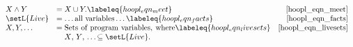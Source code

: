 \begin{math}
  \begin{array}{llr}
    X \wedge Y &= X \cup Y.\labeleq{hoopl_eqn_meet} & \eqref{hoopl_eqn_meet} \\
    \setL{Live} &= \dots \text{all variables} \dots \labeleq{hoopl_eqn_facts} & \eqref{hoopl_eqn_facts} \\
    X, Y, \dots &= \begin{minipage}[t]{2in}
      Sets of program variables, where $X$, $Y$, \dots $\subseteq \setL{Live}$.
    \end{minipage} \labeleq{hoopl_eqn_livesets} & \eqref{hoopl_eqn_livesets} %
  \end{array}
\end{math}


